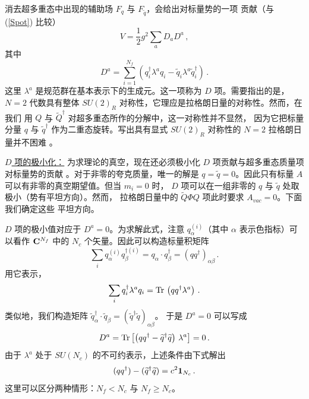 消去超多重态中出现的辅助场 $F_q$ 与 $F_{\widetilde q}$，会给出对标量势的一项
贡献（与 (\ref{Spot}) 比较）
$$
V=\frac{1}{2}g^2\sum_a D_a D^a\,,
$$
其中
\begin{equation}
D^a=\sum_{i=1}^{N_f}\left(q^\dagger_i\lambda^a q_i -\widetilde
q_i\lambda^a \widetilde q_i^\dagger\right)\,.
\label{D-term}
\end{equation}
这里 $\lambda^a$ 是规范群在基本表示下的生成元。这一项称为 $D$ 项。需要指出的是，
$N=2$ 代数具有整体 $SU(2)_R$ 对称性，它理应是拉格朗日量的对称性。然而，在我们
用 $Q$ 与 $\widetilde Q^\dagger$ 对超多重态所作的分解中，这一对称性并不显然，
因为它把标量分量 $q$ 与 $\widetilde q^\dagger$ 作为二重态旋转。写出具有显式
$SU(2)_R$ 对称性的 $N=2$ 拉格朗日量并不困难 \cite{West}。

\noindent\underline{$D$ 项的极小化：}
为求理论的真空，现在还必须极小化 $D$ 项贡献与超多重态质量项对标量势的贡献
\cite{DDS,ADS}。对于非零的夸克质量，唯一的解是
$q=\widetilde q =0$。因此只有标量 $A$ 可以有非零的真空期望值。但当 $m_i=0$ 时，
$D$ 项可以在一组非零的 $q$ 与 $\widetilde q$ 处取极小（势有平坦方向）。然而，
拉格朗日量中的 $\widetilde Q\Phi Q$ 项此时要求 $A_{vac}=0$。下面我们确定这些
平坦方向。

$D$ 项的极小值对应于 $D^a=0$。为求解此式，注意 $q^{(i)}_\alpha$（其中 $\alpha$
表示色指标）可以看作 ${\bf C}^{N_f}$ 中的 $N_c$ 个矢量。因此可以构造标量积矩阵
$$
\sum_i q^{(i)}_\alpha q^{\dagger (i)}_\beta=q_\alpha\cdot
q^\dagger_\beta=(qq^\dagger)_{\alpha\beta}\,.
$$
用它表示，
$$
\sum_i q^\dagger_i\lambda^aq_i={\rm Tr}\,\left(qq^\dagger
\lambda^a\right) \,.
$$
类似地，我们构造矩阵 $\widetilde q_\alpha^\dagger \cdot
\widetilde q_\beta = (\widetilde q^\dagger\widetilde q)_{\alpha\beta}$。
于是 $D^a=0$ 可以写成
$$
D^a={\rm Tr}\left[\left(qq^\dagger-\widetilde q^\dagger
\widetilde q\right)\,\lambda^a\right]=0 \,.
$$
由于 $\lambda^a$ 处于 $SU(N_c)$ 的不可约表示，上述条件由下式解出
\begin{equation}
(qq^\dagger) - (\widetilde q^\dagger\widetilde q)=c^2{\bf 1}_{N_c}\,.
\label{D=0} 
\end{equation}
这里可以区分两种情形：$N_f < N_c$ 与 $N_f\geq N_c$。

